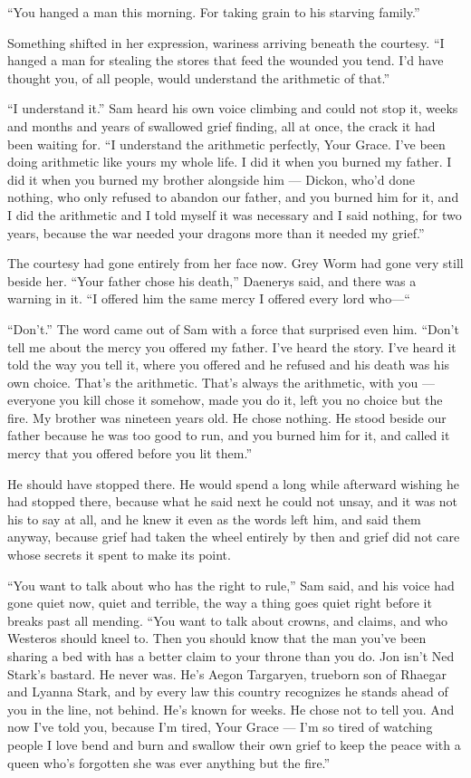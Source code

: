 “You hanged a man this morning. For taking grain to his starving family.”

Something shifted in her expression, wariness arriving beneath the courtesy. “I hanged a man for stealing the stores that feed the wounded you tend. I’d have thought you, of all people, would understand the arithmetic of that.”

“I understand it.” Sam heard his own voice climbing and could not stop it, weeks and months and years of swallowed grief finding, all at once, the crack it had been waiting for. “I understand the arithmetic perfectly, Your Grace. I’ve been doing arithmetic like yours my whole life. I did it when you burned my father. I did it when you burned my brother alongside him — Dickon, who’d done nothing, who only refused to abandon our father, and you burned him for it, and I did the arithmetic and I told myself it was necessary and I said nothing, for two years, because the war needed your dragons more than it needed my grief.”

The courtesy had gone entirely from her face now. Grey Worm had gone very still beside her. “Your father chose his death,” Daenerys said, and there was a warning in it. “I offered him the same mercy I offered every lord who—“

“Don’t.” The word came out of Sam with a force that surprised even him. “Don’t tell me about the mercy you offered my father. I’ve heard the story. I’ve heard it told the way you tell it, where you offered and he refused and his death was his own choice. That’s the arithmetic. That’s always the arithmetic, with you — everyone you kill chose it somehow, made you do it, left you no choice but the fire. My brother was nineteen years old. He chose nothing. He stood beside our father because he was too good to run, and you burned him for it, and called it mercy that you offered before you lit them.”

\sceneBreak

He should have stopped there. He would spend a long while afterward wishing he had stopped there, because what he said next he could not unsay, and it was not his to say at all, and he knew it even as the words left him, and said them anyway, because grief had taken the wheel entirely by then and grief did not care whose secrets it spent to make its point.

“You want to talk about who has the right to rule,” Sam said, and his voice had gone quiet now, quiet and terrible, the way a thing goes quiet right before it breaks past all mending. “You want to talk about crowns, and claims, and who Westeros should kneel to. Then you should know that the man you’ve been sharing a bed with has a better claim to your throne than you do. Jon isn’t Ned Stark’s bastard. He never was. He’s Aegon Targaryen, trueborn son of Rhaegar and Lyanna Stark, and by every law this country recognizes he stands ahead of you in the line, not behind. He’s known for weeks. He chose not to tell you. And now I’ve told you, because I’m tired, Your Grace — I’m so tired of watching people I love bend and burn and swallow their own grief to keep the peace with a queen who’s forgotten she was ever anything but the fire.”

